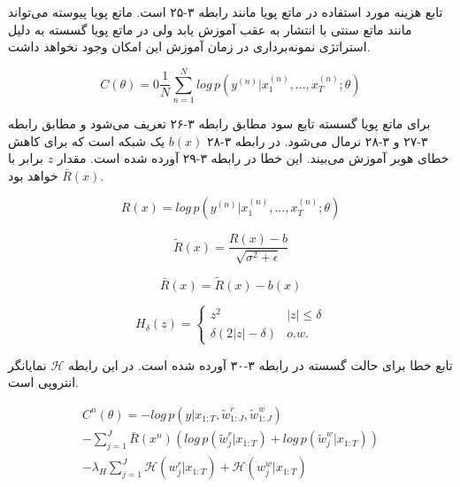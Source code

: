 تابع هزینه مورد استفاده در ماتع پویا مانند رابطه ۳-۲۵ است. ماتع پویا پیوسته می‌تواند مانند ماتع سنتی با انتشار به عقب  آموزش یابد ولی در ماتع پویا گسسته به دلیل استراتژی نمونه‌برداری در زمان آموزش این امکان وجود نخواهد داشت.\cite{gulcehre2018dynamic}

\begin{equation}
C(\theta) = 0 \frac{1}{N} \sum_{n=1}^N log\, p(y^{(n)}|x_1^{(n)},...,x_T^{(n)}; \theta)
\end{equation}

برای ماتع پویا گسسته تابع سود مطابق رابطه ۳-۲۶ تعریف می‌شود و مطابق رابطه ۳-۲۷ و ۳-۲۸ نرمال می‌شود. در رابطه ۳-۲۸ $b(x)$ یک شبکه است که برای کاهش خطای هوبر آموزش می‌بیند. این خطا در رابطه ۳-۲۹ آورده شده است. مقدار $z$ برابر با $\bar{R}(x)$ خواهد بود.\cite{gulcehre2018dynamic}

\begin{equation}
R(x) = log\, p(y^{(n)}|x_1^{(n)},...,x_T^{(n)}; \theta)
\end{equation}

\begin{equation}
\tilde{R}(x) = \frac{R(x)-b}{\sqrt{\sigma^2+\epsilon}}
\end{equation}

\begin{equation}
\bar{R}(x) = \tilde{R}(x) - b(x)
\end{equation}

\begin{equation}
H_\delta(z) = \begin{cases}
z^2 &\text{$|z| \le \delta$} \\
\delta(2|z|-\delta) & \text{$o.w.$}
\end{cases}
\end{equation}

تابع خطا برای حالت گسسته در رابطه ۳-۳۰ آورده شده است. در این رابطه $\mathcal{H}$ نمایانگر انتروپی است.

\begin{multline}
C^n(\theta) = -log\,p(y|x_{1:T}, \tilde{w}^r_{1:J}, \tilde{w}^w_{1:J})\\
- {\sum_{j=1}^J{\bar{R}(x^n)(log\,p(\tilde{w}^r_j|x_{1:T})+log\,p(\tilde{w}^w_j|x_{1:T}))}}\\
- {\lambda_H \sum_{j=1}^J{\mathcal{H}(w_j^r|x_{1:T})+\mathcal{H}(w_j^w|x_{1:T})}}
\end{multline}